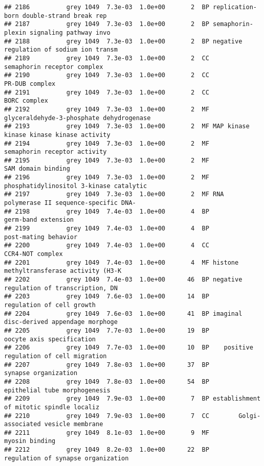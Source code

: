 \documentclass[]{article}
\begin{document}
\begin{verbatim}
## 2186          grey 1049  7.3e-03  1.0e+00       2  BP replication-born double-strand break rep
## 2187          grey 1049  7.3e-03  1.0e+00       2  BP semaphorin-plexin signaling pathway invo
## 2188          grey 1049  7.3e-03  1.0e+00       2  BP negative regulation of sodium ion transm
## 2189          grey 1049  7.3e-03  1.0e+00       2  CC              semaphorin receptor complex
## 2190          grey 1049  7.3e-03  1.0e+00       2  CC                           PR-DUB complex
## 2191          grey 1049  7.3e-03  1.0e+00       2  CC                             BORC complex
## 2192          grey 1049  7.3e-03  1.0e+00       2  MF glyceraldehyde-3-phosphate dehydrogenase
## 2193          grey 1049  7.3e-03  1.0e+00       2  MF MAP kinase kinase kinase kinase activity
## 2194          grey 1049  7.3e-03  1.0e+00       2  MF             semaphorin receptor activity
## 2195          grey 1049  7.3e-03  1.0e+00       2  MF                       SAM domain binding
## 2196          grey 1049  7.3e-03  1.0e+00       2  MF phosphatidylinositol 3-kinase catalytic 
## 2197          grey 1049  7.3e-03  1.0e+00       2  MF RNA polymerase II sequence-specific DNA-
## 2198          grey 1049  7.4e-03  1.0e+00       4  BP                      germ-band extension
## 2199          grey 1049  7.4e-03  1.0e+00       4  BP                     post-mating behavior
## 2200          grey 1049  7.4e-03  1.0e+00       4  CC                         CCR4-NOT complex
## 2201          grey 1049  7.4e-03  1.0e+00       4  MF histone methyltransferase activity (H3-K
## 2202          grey 1049  7.4e-03  1.0e+00      46  BP negative regulation of transcription, DN
## 2203          grey 1049  7.6e-03  1.0e+00      14  BP                regulation of cell growth
## 2204          grey 1049  7.6e-03  1.0e+00      41  BP imaginal disc-derived appendage morphoge
## 2205          grey 1049  7.7e-03  1.0e+00      19  BP                oocyte axis specification
## 2206          grey 1049  7.7e-03  1.0e+00      10  BP    positive regulation of cell migration
## 2207          grey 1049  7.8e-03  1.0e+00      37  BP                     synapse organization
## 2208          grey 1049  7.8e-03  1.0e+00      54  BP            epithelial tube morphogenesis
## 2209          grey 1049  7.9e-03  1.0e+00       7  BP establishment of mitotic spindle localiz
## 2210          grey 1049  7.9e-03  1.0e+00       7  CC        Golgi-associated vesicle membrane
## 2211          grey 1049  8.1e-03  1.0e+00       9  MF                           myosin binding
## 2212          grey 1049  8.2e-03  1.0e+00      22  BP       regulation of synapse organization

\end{verbatim}
\end{document}
